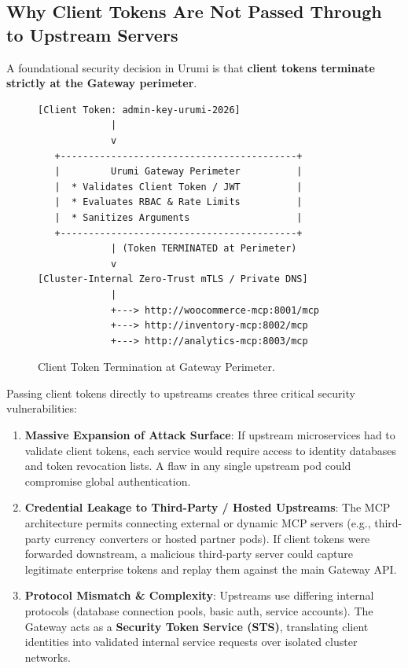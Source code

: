 \documentclass[11pt,a4paper]{article}
\begin{document}
\subsection{Why Client Tokens Are Not Passed Through to Upstream Servers}
A foundational security decision in Urumi is that \textbf{client tokens terminate strictly at the Gateway perimeter}.

\begin{figure}[h!]
\centering
\small
\begin{verbatim}
[Client Token: admin-key-urumi-2026]
             |
             v
   +------------------------------------------+
   |         Urumi Gateway Perimeter          |
   |  * Validates Client Token / JWT          |
   |  * Evaluates RBAC & Rate Limits          |
   |  * Sanitizes Arguments                   |
   +------------------------------------------+
             | (Token TERMINATED at Perimeter)
             v
[Cluster-Internal Zero-Trust mTLS / Private DNS]
             |
             +---> http://woocommerce-mcp:8001/mcp
             +---> http://inventory-mcp:8002/mcp
             +---> http://analytics-mcp:8003/mcp
\end{verbatim}
\caption{Client Token Termination at Gateway Perimeter.}
\label{fig:token_termination}
\end{figure}

\noindent Passing client tokens directly to upstreams creates three critical security vulnerabilities:
\begin{enumerate}[leftmargin=*]
    \item \textbf{Massive Expansion of Attack Surface}: If upstream microservices had to validate client tokens, each service would require access to identity databases and token revocation lists. A flaw in any single upstream pod could compromise global authentication.
    \item \textbf{Credential Leakage to Third-Party / Hosted Upstreams}: The MCP architecture permits connecting external or dynamic MCP servers (e.g., third-party currency converters or hosted partner pods). If client tokens were forwarded downstream, a malicious third-party server could capture legitimate enterprise tokens and replay them against the main Gateway API.
    \item \textbf{Protocol Mismatch \& Complexity}: Upstreams use differing internal protocols (database connection pools, basic auth, service accounts). The Gateway acts as a \textbf{Security Token Service (STS)}, translating client identities into validated internal service requests over isolated cluster networks.
\end{enumerate}
\end{document}
